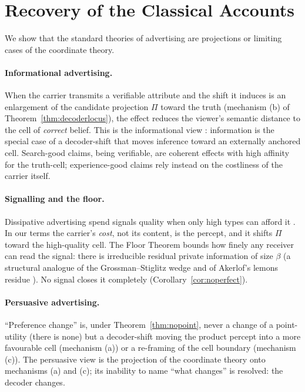\documentclass[twocolumn,11pt,a4paper]{article}
\theoremstyle{adv}
\theoremstyle{definition}
\theoremstyle{remark}
\newcommand{\Proj}{\Pi}                %
\newcommand{\floor}{\beta}            %
\begin{document}
\section{Recovery of the Classical Accounts}
\label{sec:recovery}

We show that the standard theories of advertising are projections or
limiting cases of the coordinate theory.

\paragraph{Informational advertising.}
When the carrier transmits a verifiable attribute and the shift it induces
is an enlargement of the candidate projection $\Proj$ toward the truth
(mechanism (b) of Theorem~\ref{thm:decoderlocus}), the effect reduces the
viewer's semantic distance to the cell of \emph{correct} belief. This is
the informational view \citep{stigler1961,nelson1974}: information is the
special case of a decoder-shift that moves inference toward an externally
anchored cell. Search-good claims, being verifiable, are coherent effects
with high affinity for the truth-cell; experience-good claims rely instead
on the costliness of the carrier itself.

\paragraph{Signalling and the floor.}
Dissipative advertising spend signals quality when only high types can
afford it \citep{spence1973,milgrom1986}. In our terms the carrier's
\emph{cost}, not its content, is the percept, and it shifts $\Proj$ toward
the high-quality cell. The Floor Theorem bounds how finely any receiver can
read the signal: there is irreducible residual private information of size
$\floor$ (a structural analogue of the Grossman--Stiglitz wedge
\citep{grossman1980} and of Akerlof's lemons residue \citep{akerlof1970}).
No signal closes it completely (Corollary~\ref{cor:noperfect}).

\paragraph{Persuasive advertising.}
``Preference change'' is, under Theorem~\ref{thm:nopoint}, never a change
of a point-utility (there is none) but a decoder-shift moving the product
percept into a more favourable cell (mechanism (a)) or a re-framing of the
cell boundary (mechanism (c)). The persuasive view \citep{dixit1978,
bagwell2007} is the projection of the coordinate theory onto
mechanisms (a) and (c); its inability to name ``what changes'' is resolved:
the decoder changes.
\end{document}
